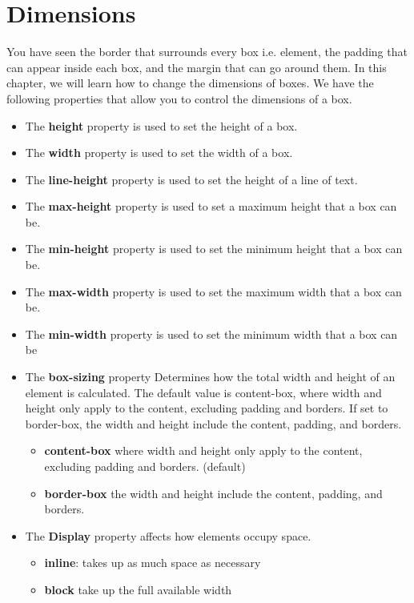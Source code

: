 \documentclass{report}
\begin{document}
    \pagebreak \bigbreak \noindent 
    \section{\LARGE Dimensions}
    \bigbreak \noindent 
    You have seen the border that surrounds every box i.e. element, the padding
that can appear inside each box, and the margin that can go around them. In
this chapter, we will learn how to change the dimensions of boxes.
\bigbreak \noindent 
We have the following properties that allow you to control the dimensions of a box.
    \begin{itemize}
        \item The \textbf{height} property is used to set the height of a box.
        \item The \textbf{width} property is used to set the width of a box.
        \item The \textbf{line-height} property is used to set the height of a line of text.
        \item The \textbf{max-height} property is used to set a maximum height that a box can be.
        \item The \textbf{min-height} property is used to set the minimum height that a box can be.
        \item The \textbf{max-width} property is used to set the maximum width that a box can be.
        \item The \textbf{min-width} property is used to set the minimum width that a box can be
        \item The \textbf{box-sizing} property Determines how the total width and height of an element is calculated. The default value is content-box, where width and height only apply to the content, excluding padding and borders. If set to border-box, the width and height include the content, padding, and borders.
            \begin{itemize}
                \item \textbf{content-box}  where width and height only apply to the content, excluding padding and borders. (default)
                \item \textbf{border-box} the width and height include the content, padding, and borders.
            \end{itemize}
        \item The \textbf{Display} property affects how elements occupy space.
            \begin{itemize}
                \item \textbf{inline}: takes up as much space as necessary
                \item \textbf{block} take up the full available width
            \end{itemize}
    \end{itemize}
\end{document}
